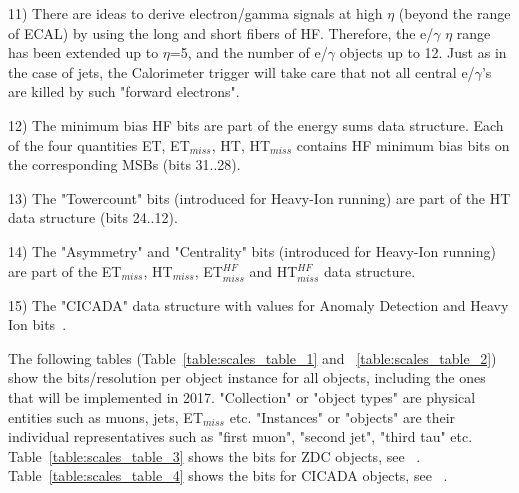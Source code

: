 \documentclass{cmspaper}
\begin{document}
11) There are ideas to derive electron/gamma signals at high $\eta$ (beyond the range of ECAL) by using the long and short fibers of HF. Therefore, the e/$\gamma$ $\eta$ range has been extended up to $\eta$=5, and the number of e/$\gamma$ objects up to 12. Just as in the case of jets, the Calorimeter trigger will take care that not all central e/$\gamma$'s are killed by such "forward electrons".

12) The minimum bias HF bits are part of the energy sums data structure. Each of the four quantities ET, ET$_{miss}$, HT, HT$_{miss}$ contains HF minimum bias bits on the corresponding MSBs (bits 31..28).

13) The "Towercount" bits (introduced for Heavy-Ion running) are part of the HT data structure (bits 24..12).

14) The "Asymmetry" and "Centrality" bits (introduced for Heavy-Ion running) are part of the ET$_{miss}$, HT$_{miss}$, ET$_{miss}^{HF}$ and HT$_{miss}^{HF}$ data structure.

15) The "CICADA" data structure with values for Anomaly Detection and Heavy Ion bits~\cite{CICADA}.

The following tables (Table~\ref{table:scales_table_1} and ~\ref{table:scales_table_2}) show the bits/resolution per object instance for all objects, including the ones that will be implemented in 2017. "Collection" or "object types" are physical entities such as muons, jets, ET$_{miss}$ etc. "Instances" or "objects" are their individual representatives such as "first muon", "second jet", "third tau" etc.\\
Table~\ref{table:scales_table_3} shows the bits for ZDC objects, see ~\cite{ZDC}.\\
Table~\ref{table:scales_table_4} shows the bits for CICADA objects, see ~\cite{CICADA}.\\
\end{document}
